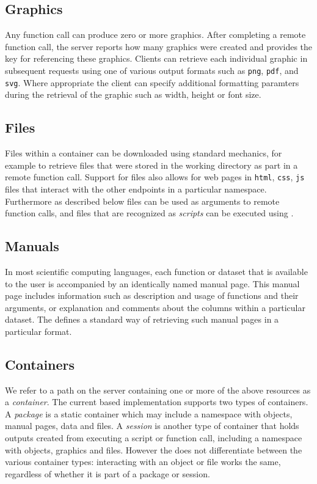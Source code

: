 \subsection{Graphics}

Any function call can produce zero or more graphics. After completing a remote function call, the server reports how many graphics were created and provides the key for referencing these graphics. Clients can retrieve each individual graphic in subsequent requests using one of various output formats such as \texttt{png}, \texttt{pdf}, and \texttt{svg}. Where appropriate the client can specify additional formatting paramters during the retrieval of the graphic such as width, height or font size.


\subsection{Files}

Files within a container can be downloaded using standard \HTTP mechanics, for example to retrieve files that were stored in the working directory as part in a remote function call. Support for files also allows for web pages in \texttt{html}, \texttt{css}, \texttt{js} files that interact with the other \API endpoints in a particular namespace. Furthermore as described below files can be used as arguments to remote function calls, and files that are recognized as \emph{scripts} can be executed using \RPC.

\subsection{Manuals}

In most scientific computing languages, each function or dataset that is available to the user is accompanied by an identically named manual page. This manual page includes information such as description and usage of functions and their arguments, or explanation and comments about the columns within a particular dataset. The \API defines a standard way of retrieving such manual pages in a particular format.

\subsection{Containers}
 
We refer to a path on the server containing one or more of the above resources as a \emph{container}. The current \R based \OpenCPU implementation supports two types of containers. A \emph{package} is a static container which may include a namespace with objects, manual pages, data and files. A \emph{session} is another type of container that holds outputs created from executing a script or function call, including a namespace with objects, graphics and files. However the \API does not differentiate between the various container types: interacting with an object or file works the same, regardless of whether it is part of a package or session.

